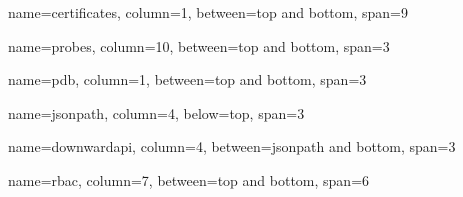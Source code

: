 \documentclass[8pt]{extarticle}
\begin{document}
\pagebreak


\begin{tcbposter}[
        poster = {spacing=0.6em, columns=12, height=\textheight},
        boxes = {},
        coverage={left=0pt, right=0pt, top=0pt, bottom=0pt},
    ]

    \begin{posterboxenv}[skin=cheatboxskin, adjusted title={Certificates}]
        {name=certificates, column=1, between=top and bottom, span=9}
        
    \end{posterboxenv}

    \begin{posterboxenv}[skin=cheatboxskin, adjusted title={Metrics Server \& Probes}]
        {name=probes, column=10, between=top and bottom, span=3}
        
    \end{posterboxenv}

\end{tcbposter}



\pagebreak


\begin{tcbposter}[
        poster = {spacing=0.6em, columns=12, height=\textheight},
        boxes = {},
        coverage={left=0pt, right=0pt, top=0pt, bottom=0pt},
    ]

    \begin{posterboxenv}[skin=cheatboxskin, adjusted title={Pod Disruption Budget}]
        {name=pdb, column=1, between=top and bottom, span=3}
        
    \end{posterboxenv}

    \begin{posterboxenv}[skin=cheatboxskin, adjusted title={JSONPath \& Output}]
        {name=jsonpath, column=4, below=top, span=3}
        
    \end{posterboxenv}

    \begin{posterboxenv}[skin=cheatboxskin, adjusted title={Downward API}]
        {name=downwardapi, column=4, between=jsonpath and bottom, span=3}
        
    \end{posterboxenv}

    \begin{posterboxenv}[skin=cheatboxskin, adjusted title={RBAC}]
        {name=rbac, column=7, between=top and bottom, span=6}
        
    \end{posterboxenv}

\end{tcbposter}
\end{document}
